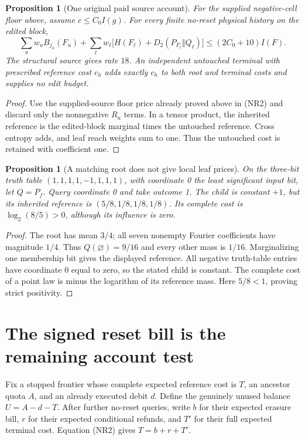 \documentclass[11pt]{article}
\newtheorem{proposition}[lemma]{Proposition}
\begin{document}
\begin{proposition}[One original paid source account]
For the supplied negative-cell floor above, assume $c\le C_0 I(g)$.
For every finite no-reset physical history on the edited block,
\[
 \sum_u w_uB_{j_u}(F_u)+
 \sum_\ell w_\ell\bigl[H(F_\ell)+D_2(P_{F_\ell}\Vert Q_\ell)\bigr]
 \le (2C_0+10)I(F).
 \tag{NR3}
\]
The structural source gives rate $18$. An independent untouched
terminal with prescribed reference cost $c_h$ adds exactly $c_h$
to both root and terminal costs and supplies no edit budget.
\end{proposition}
\begin{proof}
Use the supplied-source floor price already proved above in (NR2)
and discard only the nonnegative $R_u$ terms. In a tensor product,
the inherited reference is the edited-block marginal times the
untouched reference. Cross entropy adds, and leaf reach weights
sum to one. Thus the untouched cost is retained with coefficient one.
\end{proof}

\begin{proposition}[A matching root does not give local leaf prices]
On the three-bit truth table $(1,1,1,1,-1,1,1,1)$, with coordinate
0 the least significant input bit, let $Q=P_f$. Query coordinate 0
and take outcome 1. The child is constant $+1$, but its inherited
reference is $(5/8,1/8,1/8,1/8)$. Its complete cost is
$\log_2(8/5)>0$, although its influence is zero.
\end{proposition}
\begin{proof}
The root has mean $3/4$; all seven nonempty Fourier coefficients
have magnitude $1/4$. Thus $Q(\varnothing)=9/16$ and every
other mass is $1/16$. Marginalizing one membership bit gives
the displayed reference. All negative truth-table entries have
coordinate 0 equal to zero, so the stated child is constant.
The complete cost of a point law is minus the logarithm of its
reference mass. Here $5/8<1$, proving strict positivity.
\end{proof}

\section{The signed reset bill is the remaining account test}
\label{sec:resetbill}
Fix a stopped frontier whose complete expected reference cost is
$T$, an ancestor quota $A$, and an already executed debit $d$.
Define the genuinely unused balance $U=A-d-T$.
After further no-reset queries, write $b$ for their expected erasure
bill, $r$ for their expected conditional refunds, and $T'$ for
their full expected terminal cost. Equation (NR2) gives
$T=b+r+T'$.
\end{document}
